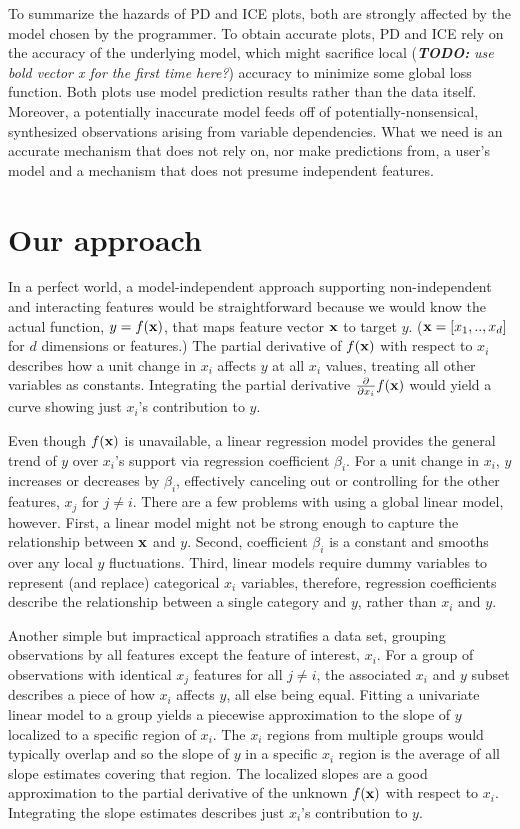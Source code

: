 \documentclass[12pt]{article}
\newcommand{\todo}[1]{{\bf\em TODO:} {\em #1}}
\begin{document}
To summarize the hazards of PD and ICE plots, both are strongly affected by the model chosen by the programmer.  To obtain accurate plots, PD and ICE rely on the accuracy of the underlying model, which might sacrifice local (\todo{use bold vector x for the first time here?}) accuracy to minimize some global loss function. Both plots use model prediction results rather than the data itself. Moreover, a potentially inaccurate model feeds off of potentially-nonsensical, synthesized observations arising from variable dependencies. What we need is an accurate mechanism that does not rely on, nor make predictions from, a user's model and a mechanism that does not presume independent features.

\section{Our approach}

In a perfect world, a model-independent approach supporting non-independent and interacting features would be straightforward because we would know the actual function, $y = f(\bf x)$, that maps feature vector $\bf x$ to target $y$.  (${\bf x} = [ x_1, .., x_d ]$ for $d$ dimensions or features.) The partial derivative of $f(\bf x)$ with respect to $x_i$ describes how a unit change in $x_i$ affects $y$ at all $x_i$ values, treating all other variables as constants. Integrating the partial derivative $\frac{\partial}{\partial x_i} f(\bf x)$ would yield a curve showing just $x_i$'s contribution to $y$. 

Even though $f(\bf x)$ is unavailable, a linear regression model provides the general trend of $y$ over $x_i$'s support via regression coefficient $\beta_i$. For a unit change in $x_i$, $y$ increases or decreases by $\beta_i$, effectively canceling out or controlling for the other features, $x_j$ for $j \neq i$. There are a few problems with using a global linear model, however.  First, a linear model might not be strong enough to capture the relationship between $\bf x$ and $y$. Second, coefficient $\beta_i$ is a constant and smooths over any local $y$ fluctuations. Third, linear models require dummy variables to represent (and replace) categorical $x_i$ variables, therefore, regression coefficients describe the relationship between a single category and $y$, rather than $x_i$ and $y$.

Another simple but impractical approach stratifies a data set, grouping observations by all features except the feature of interest, $x_i$. For a group of observations with identical $x_j$ features for all $j \neq i$, the associated $x_i$ and $y$ subset describes a piece of how $x_i$ affects $y$, all else being equal.  Fitting a univariate linear model to a group yields a piecewise approximation to the slope of $y$ localized to a specific region of $x_i$. The $x_i$ regions from multiple groups would typically overlap and so the slope of $y$ in a specific $x_i$ region is the average of all slope estimates covering that region. The localized slopes are a good approximation to the partial derivative of the unknown $f(\bf x)$ with respect to $x_i$. Integrating the slope estimates describes just $x_i$'s contribution to $y$.  
\end{document}
